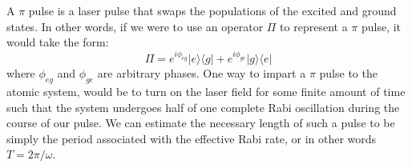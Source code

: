 A $\pi$ pulse is a laser pulse that swaps the populations of the excited and ground states. In other words, if we were to use an operator $\Pi$ to represent a $\pi$ pulse, it would take the form:
\begin{equation}
\Pi=e^{i\phi_{eg}}|e\rangle\langle g|+e^{i\phi_{ge}}|g\rangle\langle e|
\end{equation}
where $\phi_{eg}$ and $\phi_{ge}$ are arbitrary phases. 
One way to impart a $\pi$ pulse to the atomic system, would be to turn on the laser field for some finite amount of time such that the system undergoes half of one complete Rabi oscillation during the course of our pulse. We can estimate the necessary length of such a pulse to be simply the period associated with the effective Rabi rate, or in other words $T = 2\pi/\omega$.
%
%
%
%
%
%
%
%
%
%
%
